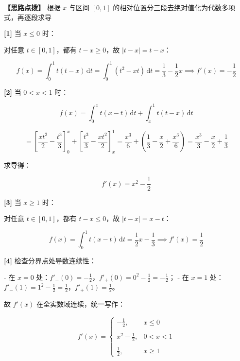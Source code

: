\documentclass[11pt,a4paper,UTF8]{ctexart}
\begin{document}
\textbf{\color{DeepPurple}【思路点拨】} 根据 $x$ 与区间 $[0, 1]$ 的相对位置分三段去绝对值化为代数多项式，再逐段求导


\begin{solbox}[分步推导与答题规范]
\textbf{[1]} 当 $x \leqslant 0$ 时：

对任意 $t \in [0, 1]$，都有 $t - x \geqslant 0$，故 $|t-x| = t-x$：


\begin{equation*}
f(x) = \int_0^1 t(t-x)\,\mathrm{d}t = \int_0^1 (t^2 - xt)\,\mathrm{d}t = \frac{1}{3} - \frac{1}{2}x \implies f'(x) = -\frac{1}{2}
\end{equation*}


\textbf{[2]} 当 $0 < x < 1$ 时：


\begin{equation*}
f(x) = \int_0^x t(x-t)\,\mathrm{d}t + \int_x^1 t(t-x)\,\mathrm{d}t
\end{equation*}



\begin{equation*}
= \left[ \frac{x t^2}{2} - \frac{t^3}{3} \right]_0^x + \left[ \frac{t^3}{3} - \frac{x t^2}{2} \right]_x^1 = \frac{x^3}{6} + \left(\frac{1}{3} - \frac{x}{2} + \frac{x^3}{6}\right) = \frac{x^3}{3} - \frac{x}{2} + \frac{1}{3}
\end{equation*}


求导得：


\begin{equation*}
f'(x) = x^2 - \frac{1}{2}
\end{equation*}


\textbf{[3]} 当 $x \geqslant 1$ 时：

对任意 $t \in [0, 1]$，都有 $t - x \leqslant 0$，故 $|t-x| = x-t$：


\begin{equation*}
f(x) = \int_0^1 t(x-t)\,\mathrm{d}t = \frac{1}{2}x - \frac{1}{3} \implies f'(x) = \frac{1}{2}
\end{equation*}


\textbf{[4]} 检查分界点处导数连续性：

- 在 $x = 0$ 处：$f'_-(0) = -\frac{1}{2}$，$f'_+(0) = 0^2 - \frac{1}{2} = -\frac{1}{2}$；
- 在 $x = 1$ 处：$f'_-(1) = 1^2 - \frac{1}{2} = \frac{1}{2}$，$f'_+(1) = \frac{1}{2}$。

故 $f'(x)$ 在全实数域连续，统一写作：


\begin{align*}
f'(x) = \begin{cases} -\frac{1}{2}, & x \leqslant 0 \\ \\ x^2 - \frac{1}{2}, & 0 < x < 1 \\ \\ \frac{1}{2}, & x \geqslant 1 \end{cases}
\end{align*}

\end{solbox}
\end{document}
